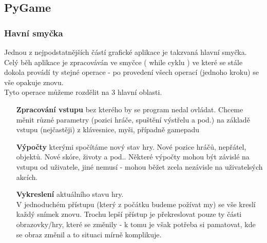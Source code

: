  





\subsection{PyGame}
\subsubsection{Havní smyčka}
Jednou z nejpodstatnějších částí grafické aplikace je takzvaná hlavní smyčka. Celý běh aplikace je zpracováván ve smyčce ( while cyklu ) ve které se stále dokola provádí ty stejné operace - po provedení všech operací (jednoho kroku) se vše opakuje znovu.\\
Tyto operace můžeme rozdělit na 3 hlavní oblasti.
\begin{enumerate}
\item [\textbf{Zpracování vstupu}] bez kterého by se program nedal ovládat. Chceme měnit různé parametry (pozici hráče, spuštění výstřelu a pod.) na základě vstupu (nejčastěji) z klávesnice, myši, případně gamepadu
\item [\textbf{Výpočty}] kterými spočítáme nový stav hry. Nové pozice hráčů, nepřátel, objektů. Nové skóre, životy a pod.. Některé výpočty mohou být závislé na vstupu od uživatele, jiné nemusí - mohou běžet zcela nezávisle na uživatelsých akcích.
\item [\textbf{Vykreslení}] aktuálního stavu hry.\\V jednoduchém přístupu (který z počátku budeme požívat my) se vše kreslí každý snímek znovu. Trochu lepší přístup je překreslovat pouze ty části obrazovky/hry, které se změnily - k tomu je však potřeba si pamatovat, kde se obraz změnil a to situaci mírně komplikuje.
\end{enumerate}

